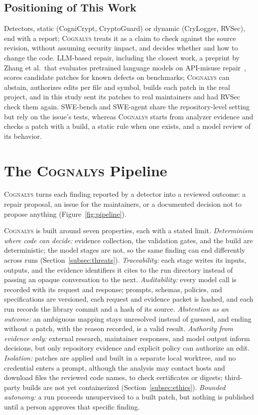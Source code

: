 \documentclass[conference]{IEEEtran}
\newcommand{\system}{\textsc{Cognalys}}
\begin{document}
\subsection{Positioning of This Work}

Detectors, static (CogniCrypt, CryptoGuard) or dynamic (CryLogger, RVSec), end
with a report; \system{} treats it as a claim to check against the source
revision, without assuming security impact, and decides whether and how to
change the code. LLM-based repair, including the closest work, a preprint by
Zhang et al.\ that evaluates pretrained language models on API-misuse
repair~\cite{zhang2023apimisuse}, scores candidate patches for known defects on
benchmarks; \system{} can abstain, authorizes edits per file and symbol, builds
each patch in the real project, and in this study sent its patches to real
maintainers and had RVSec check them again. SWE-bench and SWE-agent share the
repository-level setting but rely on the issue's tests, whereas \system{}
starts from analyzer evidence and checks a patch with a build, a static rule
when one exists, and a model review of its behavior.

\section{The \system{} Pipeline}
\label{sec:pipeline}
\label{subsec:library}

\system{} turns each finding reported by a detector into a reviewed outcome: a repair proposal, an issue
for the maintainers, or a documented decision not to propose anything
(Figure~\ref{fig:pipeline}).

\system{} is built around seven properties, each with a stated limit.
\emph{Determinism where code can decide:} evidence collection, the validation
gates, and the build are deterministic; the model stages are not, so the same
finding can end differently across runs (Section~\ref{subsec:threats}).
\emph{Traceability:} each stage writes its inputs, outputs, and the evidence
identifiers it cites to the run directory instead of passing an opaque
conversation to the next.
\emph{Auditability:} every model
call is recorded with its request and response; prompts, schemas, policies, and
specifications are versioned, each request and evidence packet is hashed, and
each run records the library commit and a hash of its source.
\emph{Abstention as an outcome:} an ambiguous mapping stays unresolved instead
of guessed, and ending without a patch, with the reason recorded, is a valid
result. \emph{Authority from evidence only:} external research, maintainer
responses, and model output inform decisions, but only repository evidence and
explicit policy can authorize an edit. \emph{Isolation:} patches are applied
and built in a separate local worktree, and no credential enters a prompt, although the analysis may
contact hosts and download files the reviewed code names, to check certificates
or digests; third-party builds are not yet containerized
(Section~\ref{subsec:ethics}). \emph{Bounded autonomy:} a run proceeds
unsupervised to a built patch, but nothing is published until a person approves
that specific finding.
\end{document}
